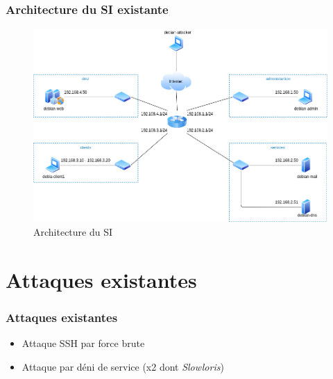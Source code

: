 \documentclass{beamer}
\begin{document}
		\begin{frame}
			\frametitle{Architecture du SI existante}
			\begin{center}
				\begin{figure}
					\includegraphics[scale=.3]{si.png}
					\caption{Architecture du SI}
				\end{figure}
			\end{center}
		\end{frame}
		\section{Attaques existantes}
		\begin{frame}
			\frametitle{Attaques existantes}
			\begin{itemize}
				\item Attaque SSH par force brute
				\item Attaque par déni de service (x2 dont \textit{Slowloris})
			\end{itemize}
		\end{frame}
\end{document}

